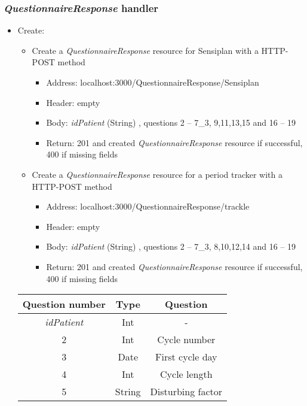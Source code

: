 \documentclass[
a4paper,
11pt
]{article}
\begin{document}
	\subsubsection*{\textit{QuestionnaireResponse} handler}
	\begin{itemize}
		\item Create:
		\begin{itemize}
			\item Create a \textit{QuestionnaireResponse} resource for Sensiplan\textsuperscript{\textcopyright} with a \ac{HTTP}-POST method
			\begin{itemize}
				\item Address: localhost:3000/QuestionnaireResponse/Sensiplan
				\item Header: empty
				\item Body: \textit{idPatient} (String) , questions 2 – 7\_3, 9,11,13,15 and 16 – 19
				\item Return: 201 and created \textit{QuestionnaireResponse} resource if successful, 400 if missing fields
			\end{itemize}
		\newpage
			\item Create a \textit{QuestionnaireResponse} resource for a period tracker with a \ac{HTTP}-POST method
			\begin{itemize}
				\item Address: localhost:3000/QuestionnaireResponse/trackle
				\item Header: empty
				\item Body: \textit{idPatient} (String) , questions 2 – 7\_3, 8,10,12,14 and 16 – 19
				\item Return: 201 and created \textit{QuestionnaireResponse} resource if successful, 400 if missing fields
			\end{itemize}
		\end{itemize}
		\begin{center}
			\begin{table}[h]
			\begin{tabular}{|c|c|c|}
				\hline
				\textbf{Question number} & \textbf{Type} & \textbf{Question} \\
				\hline
				\textit{idPatient} & Int & - \\
				\hline
				2 & Int & Cycle number \\
				\hline
				3 & Date & First cycle day \\
				\hline
				4 & Int & Cycle length \\
				\hline
				5 & String & Disturbing factor \\

\end{tabular}
\end{table}
\end{center}
\end{itemize}
\end{document}
